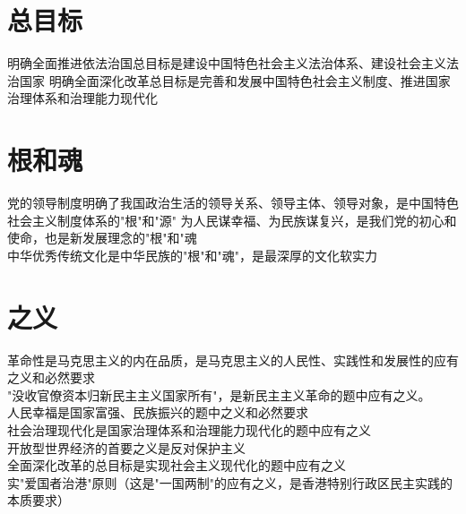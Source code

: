 \documentclass[11pt,a4paper,titlepage]{article}
\begin{document}
\section{总目标}
明确全面推进依法治国总目标是建设中国特色社会主义法治体系、建设社会主义法治国家
明确全面深化改革总目标是完善和发展中国特色社会主义制度、推进国家治理体系和治理能力现代化\\
\section{根和魂}
党的领导制度明确了我国政治生活的领导关系、领导主体、领导对象，是中国特色社会主义制度体系的"根"和"源"
为人民谋幸福、为民族谋复兴，是我们党的初心和使命，也是新发展理念的"根"和"魂\\   
中华优秀传统文化是中华民族的"根"和"魂"，是最深厚的文化软实力\\
\section{之义}
革命性是马克思主义的内在品质，是马克思主义的人民性、实践性和发展性的应有之义和必然要求\\
"没收官僚资本归新民主主义国家所有"，是新民主主义革命的题中应有之义。\\
人民幸福是国家富强、民族振兴的题中之义和必然要求 \\
社会治理现代化是国家治理体系和治理能力现代化的题中应有之义\\
开放型世界经济的首要之义是反对保护主义\\
全面深化改革的总目标是实现社会主义现代化的题中应有之义\\
实"爱国者治港"原则（这是"一国两制"的应有之义，是香港特别行政区民主实践的本质要求）\\
\end{document}
